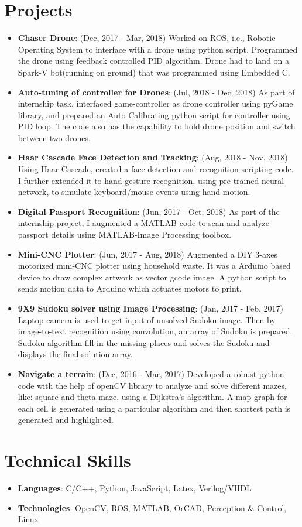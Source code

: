 \documentclass[letterpaper,11pt]{article}
\newcommand{\resumeItem}[2]{
  \item\small{
    \textbf{#1}{: #2 \vspace{-2pt}}
  }
}
\newcommand{\resumeSubHeadingListStart}{\begin{itemize}[leftmargin=*]}
\newcommand{\resumeSubHeadingListEnd}{\end{itemize}}
\begin{document}
\section{Projects}
  \resumeSubHeadingListStart
        \resumeItem{Chaser Drone}{(Dec, 2017 - Mar, 2018) Worked on ROS, i.e., Robotic Operating System to interface with a drone using python script. Programmed the drone using feedback controlled PID algorithm. Drone had to land on a Spark-V bot(running on ground) that was programmed using Embedded C.}
        \resumeItem{Auto-tuning of controller for Drones}{(Jul, 2018 - Dec, 2018) As part of internship task, interfaced game-controller as drone controller using pyGame library, and prepared an Auto Calibrating python script for controller using PID loop. The code also has the capability to hold drone position and switch between two drones.}
        \resumeItem{Haar Cascade Face Detection and Tracking}{(Aug, 2018 - Nov, 2018) Using Haar Cascade,  created a face detection and recognition scripting code. I further extended it to hand gesture recognition, using pre-trained neural network, to simulate keyboard/mouse events using hand motion.}
        \resumeItem{Digital Passport Recognition}{(Jun, 2017 - Oct, 2018) As part of the internship project, I augmented a MATLAB code to scan and analyze passport details using MATLAB-Image Processing toolbox.}
        \resumeItem{Mini-CNC Plotter}{(Jun, 2017 - Aug, 2018) Augmented a DIY 3-axes motorized mini-CNC plotter using household waste. It was a Arduino based device to draw complex artwork as vector gcode image. A python script to sends motion data to Arduino which actuates motors to print.}
        \resumeItem{9X9 Sudoku solver using Image Processing}{(Jan, 2017 - Feb, 2017) Laptop camera is used to get input of unsolved-Sudoku image. Then by image-to-text recognition using convolution, an array of Sudoku is prepared. Sudoku algorithm fill-in the missing places and solves the Sudoku and displays the final solution array.}
        \resumeItem{Navigate a terrain}{(Dec, 2016 - Mar, 2017) Developed a robust python code with the help of openCV library to analyze and solve different mazes, like: square and theta maze, using a Dijkstra's algorithm. A map-graph for each cell is generated using a particular algorithm and then shortest path is generated and highlighted.}
  \resumeSubHeadingListEnd

\section{Technical Skills}
  \resumeSubHeadingListStart
    \item{\textbf{Languages}{: C/C++, Python, JavaScript, Latex, Verilog/VHDL}}
      \hfill
      \item{\textbf{Technologies}{: OpenCV, ROS, MATLAB, OrCAD, Perception \& Control, Linux}}
  \resumeSubHeadingListEnd
  
\end{document}
